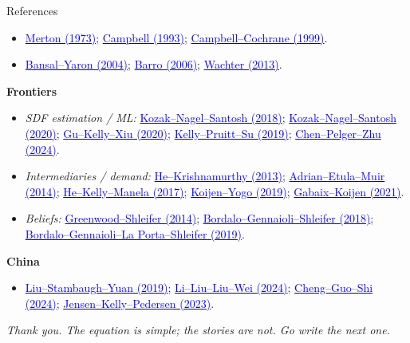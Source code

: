 \documentclass{beamer}
\begin{document}
\begin{frame}[allowframebreaks]{References}
\begin{itemize}
  \item \href{https://doi.org/10.2307/1913811}{\textcolor{blue}{Merton (1973)}}; \href{https://www.jstor.org/stable/2117530}{\textcolor{blue}{Campbell (1993)}}; \href{https://doi.org/10.1086/250059}{\textcolor{blue}{Campbell--Cochrane (1999)}}.
  \item \href{https://doi.org/10.1111/j.1540-6261.2004.00670.x}{\textcolor{blue}{Bansal--Yaron (2004)}}; \href{https://doi.org/10.1162/qjec.121.3.823}{\textcolor{blue}{Barro (2006)}}; \href{https://doi.org/10.1111/jofi.12018}{\textcolor{blue}{Wachter (2013)}}.
\end{itemize}
\framebreak
\scriptsize
\textbf{Frontiers}
\begin{itemize}
  \item \emph{SDF estimation / ML:} \href{https://doi.org/10.1111/jofi.12612}{\textcolor{blue}{Kozak--Nagel--Santosh (2018)}}; \href{https://doi.org/10.1016/j.jfineco.2019.06.008}{\textcolor{blue}{Kozak--Nagel--Santosh (2020)}}; \href{https://doi.org/10.1093/rfs/hhaa009}{\textcolor{blue}{Gu--Kelly--Xiu (2020)}}; \href{https://doi.org/10.1016/j.jfineco.2019.05.001}{\textcolor{blue}{Kelly--Pruitt--Su (2019)}}; \href{https://doi.org/10.1287/mnsc.2023.4695}{\textcolor{blue}{Chen--Pelger--Zhu (2024)}}.
  \item \emph{Intermediaries / demand:} \href{https://doi.org/10.1257/aer.103.2.732}{\textcolor{blue}{He--Krishnamurthy (2013)}}; \href{https://doi.org/10.1111/jofi.12189}{\textcolor{blue}{Adrian--Etula--Muir (2014)}}; \href{https://doi.org/10.1016/j.jfineco.2017.08.002}{\textcolor{blue}{He--Kelly--Manela (2017)}}; \href{https://doi.org/10.1086/701683}{\textcolor{blue}{Koijen--Yogo (2019)}}; \href{https://doi.org/10.3386/w28967}{\textcolor{blue}{Gabaix--Koijen (2021)}}.
  \item \emph{Beliefs:} \href{https://doi.org/10.1093/rfs/hht082}{\textcolor{blue}{Greenwood--Shleifer (2014)}}; \href{https://doi.org/10.1111/jofi.12586}{\textcolor{blue}{Bordalo--Gennaioli--Shleifer (2018)}}; \href{https://doi.org/10.1111/jofi.12833}{\textcolor{blue}{Bordalo--Gennaioli--La Porta--Shleifer (2019)}}.
\end{itemize}
\textbf{China}
\begin{itemize}
  \item \href{https://doi.org/10.1016/j.jfineco.2019.03.008}{\textcolor{blue}{Liu--Stambaugh--Yuan (2019)}}; \href{https://doi.org/10.1287/mnsc.2023.4904}{\textcolor{blue}{Li--Liu--Liu--Wei (2024)}}; \href{https://www.sciencedirect.com/science/article/pii/S0378426624000372}{\textcolor{blue}{Cheng--Guo--Shi (2024)}}; \href{https://doi.org/10.1111/jofi.13249}{\textcolor{blue}{Jensen--Kelly--Pedersen (2023)}}.
\end{itemize}
\begin{center}
\textit{Thank you. The equation is simple; the stories are not. Go write the next one.}
\end{center}
\end{frame}
\end{document}
